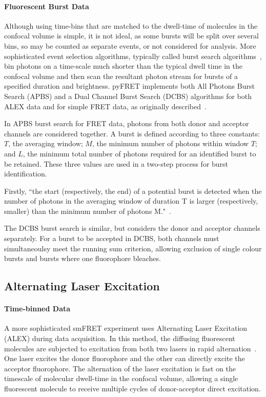 \paragraph{Fluorescent Burst Data}
Although using time-bins that are matched to the dwell-time of molecules in the confocal volume is simple, it is not ideal, as some bursts will be split over several bins, so may be counted as separate events, or not considered for analysis. More sophisticated event selection algorithms, typically called burst search algorithms~\cite{nir06}, bin photons on a time-scale much shorter than the typical dwell time in the confocal volume and then scan the resultant photon stream for bursts of a specified duration and brightness. pyFRET implements both All Photons Burst Search (APBS) and a Dual Channel Burst Search (DCBS) algorithms for both ALEX data and for simple FRET data, as originally described~\cite{nir06}.

In APBS burst search for FRET data, photons from both donor and acceptor channels are considered together. A burst is defined according to three constants: $T$, the averaging window; $M$, the minimum number of photons within window $T$; and $L$, the minimum total number of photons required for an identified burst to be retained. These three values are used in a two-step process for burst identification.

Firstly, ``the start (respectively, the end) of a potential burst is detected when the number of photons in the averaging window of duration T is larger (respectively, smaller) than the minimum number of photons M."~\cite{nir06}.

The DCBS burst search is similar, but considers the donor and acceptor channels separately. For a burst to be accepted in DCBS, both channels must simultaneoulsy meet the running sum criterion, allowing exclusion of single colour bursts and bursts where one fluorophore bleaches.

\subsection{Alternating Laser Excitation}
\paragraph{Time-binned Data}
A more sophisticated smFRET experiment uses Alternating Laser Excitation (ALEX) during data acquisition. In this method, the diffusing fluorescent molecules are subjected to excitation from both two lasers in rapid alternation~\cite{kapanidis05}. One laser excites the donor fluorophore and the other can directly excite the acceptor fluorophore. The alternation of the laser excitation is fast on the timescale of molecular dwell-time in the confocal volume, allowing a single fluorescent molecule to receive multiple cycles of donor-acceptor direct excitation.

